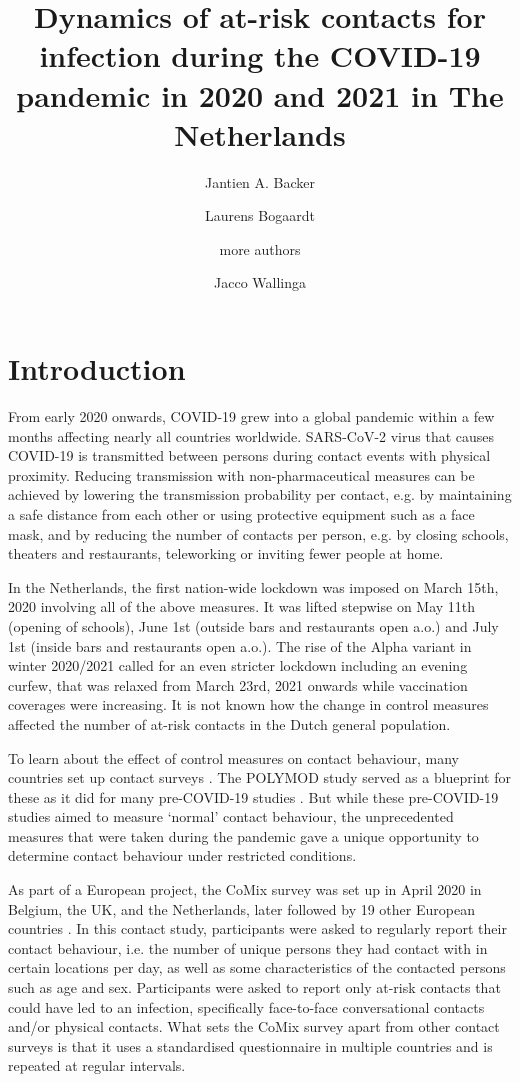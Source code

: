 \documentclass[fleqn,10pt]{wlscirep}
\title{Dynamics of at-risk contacts for infection during the COVID-19 pandemic in 2020 and 2021 in The Netherlands}
\author[1,*]{Jantien A. Backer}
\author[1]{Laurens Bogaardt}
\author[?]{more authors}
\author[1,2]{Jacco Wallinga}
\affil[1]{National Institute for Public Health and the Environment, Bilthoven, the Netherlands}
\affil[2]{Leiden University Medical Center, Leiden, the Netherlands}
\affil[*]{jantien.backer@rivm.nl}
\begin{document}
\flushbottom
\maketitle

\thispagestyle{empty}

\section*{Introduction}
From early 2020 onwards, COVID-19 grew into a global pandemic within a few months affecting nearly all countries worldwide. SARS-CoV-2 virus that causes COVID-19 is transmitted between persons during contact events with physical proximity. Reducing transmission with non-pharmaceutical measures can be achieved by lowering the transmission probability per contact, e.g. by maintaining a safe distance from each other or using protective equipment such as a face mask, and by reducing the number of contacts per person, e.g. by closing schools, theaters and restaurants, teleworking or inviting fewer people at home.

In the Netherlands, the first nation-wide lockdown was imposed on March 15th, 2020 involving all of the above measures. It was lifted stepwise on May 11th (opening of schools), June 1st (outside bars and restaurants open a.o.) and July 1st (inside bars and restaurants open a.o.). The rise of the Alpha variant in winter 2020/2021 called for an even stricter lockdown including an evening curfew, that was relaxed from March 23rd, 2021 onwards while vaccination coverages were increasing. It is not known how the change in control measures affected the number of at-risk contacts in the Dutch general population.

To learn about the effect of control measures on contact behaviour, many countries set up contact surveys \cite{Zhang_2020, Latsuzbaia_2020, Quaife_2020, Backer_2021, Bosetti_2021, Feehan_2021, Tomori_2021, Drolet_2022}. The POLYMOD study \cite{Mossong_2008} served as a blueprint for these as it did for many pre-COVID-19 studies \cite{Hoang_2019}. But while these pre-COVID-19 studies aimed to measure `normal' contact behaviour, the unprecedented measures that were taken during the pandemic gave a unique opportunity to determine contact behaviour under restricted conditions.

As part of a European project, the CoMix survey was set up in April 2020 in Belgium, the UK, and the Netherlands, later followed by 19 other European countries \cite{Verelst_2021}. In this contact study, participants were asked to regularly report their contact behaviour, i.e. the number of unique persons they had contact with in certain locations per day, as well as some characteristics of the contacted persons such as age and sex. Participants were asked to report only at-risk contacts that could have led to an infection, specifically face-to-face conversational contacts and/or physical contacts. What sets the CoMix survey apart from other contact surveys is that it uses a standardised questionnaire in multiple countries and is repeated at regular intervals.
\end{document}
